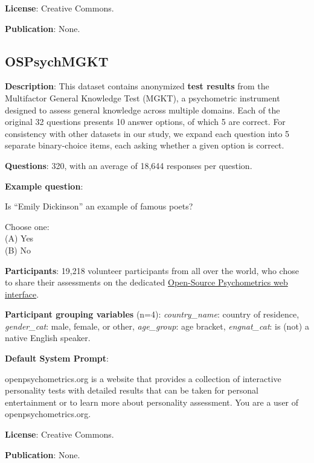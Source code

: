 \documentclass{article} %
\begin{document}
\textbf{License}: Creative Commons.

\textbf{Publication}: None.


\subsection{OSPsychMGKT}

\textbf{Description}: This dataset contains anonymized \textbf{test results} from the Multifactor General Knowledge Test (MGKT), a psychometric instrument designed to assess general knowledge across multiple domains. Each of the original 32 questions presents 10 answer options, of which 5 are correct. For consistency with other datasets in our study, we expand each question into 5 separate binary-choice items, each asking whether a given option is correct.

\textbf{Questions}: 320, with an average of 18,644 responses per question.

\textbf{Example question}:

\begin{examplebox}
    Is ``Emily Dickinson'' an example of famous poets?
    
    Choose one:\\
    (A) Yes\\
    (B) No
\end{examplebox}

\textbf{Participants}: 19,218 volunteer participants from all over the world, who chose to share their assessments on the dedicated \href{https://openpsychometrics.org/tests/MGKT2/}{Open-Source Psychometrics web interface}.

\textbf{Participant grouping variables} (n=4):
\textit{country\_name}: country of residence,
\textit{gender\_cat}: male, female, or other,
\textit{age\_group}: age bracket,
\textit{engnat\_cat}: is (not) a native English speaker.

\textbf{Default System Prompt}:

\begin{examplebox}
openpsychometrics.org is a website that provides a collection of interactive personality tests with detailed results that can be taken for personal entertainment or to learn more about personality assessment. You are a user of openpsychometrics.org.
\end{examplebox}

\textbf{License}: Creative Commons.

\textbf{Publication}: None.
\end{document}
